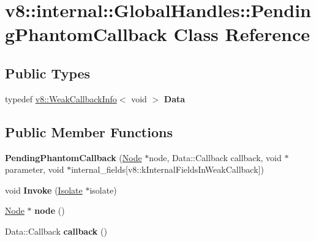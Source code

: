 \hypertarget{classv8_1_1internal_1_1_global_handles_1_1_pending_phantom_callback}{}\section{v8\+:\+:internal\+:\+:Global\+Handles\+:\+:Pending\+Phantom\+Callback Class Reference}
\label{classv8_1_1internal_1_1_global_handles_1_1_pending_phantom_callback}
\subsection*{Public Types}
\begin{DoxyCompactItemize}
\item 
typedef \hyperlink{classv8_1_1_weak_callback_info}{v8\+::\+Weak\+Callback\+Info}$<$ void $>$ {\bfseries Data}\hypertarget{classv8_1_1internal_1_1_global_handles_1_1_pending_phantom_callback_a0e7b64641dddbc60790e960bc8069e13}{}\label{classv8_1_1internal_1_1_global_handles_1_1_pending_phantom_callback_a0e7b64641dddbc60790e960bc8069e13}

\end{DoxyCompactItemize}
\subsection*{Public Member Functions}
\begin{DoxyCompactItemize}
\item 
{\bfseries Pending\+Phantom\+Callback} (\hyperlink{classv8_1_1internal_1_1_global_handles_1_1_node}{Node} $\ast$node, Data\+::\+Callback callback, void $\ast$parameter, void $\ast$internal\+\_\+fields\mbox{[}v8\+::k\+Internal\+Fields\+In\+Weak\+Callback\mbox{]})\hypertarget{classv8_1_1internal_1_1_global_handles_1_1_pending_phantom_callback_a481bdc8017b205040edbbf7021d96d21}{}\label{classv8_1_1internal_1_1_global_handles_1_1_pending_phantom_callback_a481bdc8017b205040edbbf7021d96d21}

\item 
void {\bfseries Invoke} (\hyperlink{classv8_1_1internal_1_1_isolate}{Isolate} $\ast$isolate)\hypertarget{classv8_1_1internal_1_1_global_handles_1_1_pending_phantom_callback_a547f3996ec1b21e93f710185959f490e}{}\label{classv8_1_1internal_1_1_global_handles_1_1_pending_phantom_callback_a547f3996ec1b21e93f710185959f490e}

\item 
\hyperlink{classv8_1_1internal_1_1_global_handles_1_1_node}{Node} $\ast$ {\bfseries node} ()\hypertarget{classv8_1_1internal_1_1_global_handles_1_1_pending_phantom_callback_a976355e3d044d996c85d8c4b16b6107a}{}\label{classv8_1_1internal_1_1_global_handles_1_1_pending_phantom_callback_a976355e3d044d996c85d8c4b16b6107a}

\item 
Data\+::\+Callback {\bfseries callback} ()\hypertarget{classv8_1_1internal_1_1_global_handles_1_1_pending_phantom_callback_ae439acc22ac79736977ef6e9b56ee9fe}{}\label{classv8_1_1internal_1_1_global_handles_1_1_pending_phantom_callback_ae439acc22ac79736977ef6e9b56ee9fe}

\end{DoxyCompactItemize}
